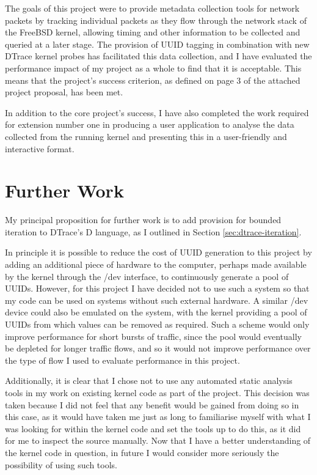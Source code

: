 \documentclass[a4paper,12pt,twoside,openright]{report}
\begin{document}
	The goals of this project were to provide metadata collection tools for network packets by tracking individual packets as they flow through the network stack of the FreeBSD kernel, allowing timing and other information to be collected and queried at a later stage. The provision of UUID tagging in combination with new DTrace kernel probes has facilitated this data collection, and I have evaluated the performance impact of my project as a whole to find that it is acceptable. This means that the project's success criterion, as defined on page 3 of the attached project proposal, has been met.
	
	In addition to the core project's success, I have also completed the work required for extension number one in producing a user application to analyse the data collected from the running kernel and presenting this in a user-friendly and interactive format.
	
	\section{Further Work}
	
	My principal proposition for further work is to add provision for bounded iteration to DTrace's D language, as I outlined in Section \ref{sec:dtrace-iteration}.
	
	In principle it is possible to reduce the cost of UUID generation to this project by adding an additional piece of hardware to the computer, perhaps made available by the kernel through the /dev interface, to continuously generate a pool of UUIDs. However, for this project I have decided not to use such a system so that my code can be used on systems without such external hardware. A similar /dev device could also be emulated on the system, with the kernel providing a pool of UUIDs from which values can be removed as required. Such a scheme would only improve performance for short bursts of traffic, since the pool would eventually be depleted for longer traffic flows, and so it would not improve performance over the type of flow I used to evaluate performance in this project.
	
	Additionally, it is clear that I chose not to use any automated static analysis tools in my work on existing kernel code as part of the project. This decision was taken because I did not feel that any benefit would be gained from doing so in this case, as it would have taken me just as long to familiarise myself with what I was looking for within the kernel code and set the tools up to do this, as it did for me to inspect the source manually. Now that I have a better understanding of the kernel code in question, in future I would consider more seriously the possibility of using such tools.
	
\end{document}
